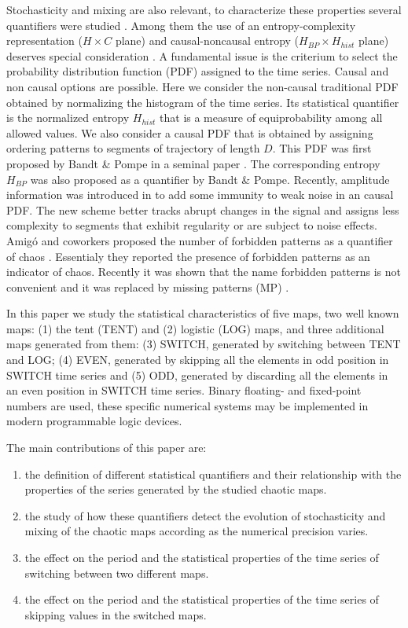 Stochasticity and mixing are also relevant, to characterize these properties several quantifiers were studied \cite{DeMicco2009}.
Among them the use of an entropy-complexity representation ($H \times C$ plane) and causal-noncausal entropy ($H_{BP} \times H_{hist}$ plane) deserves special consideration \cite{Rosso2007,DeMicco2008,DeMicco2012,DeMicco2009,Rosso2010,Antonelli2017}.
A fundamental issue is the criterium to select the probability distribution function (PDF) assigned to the time series.
Causal and non causal options are possible.
Here we consider the non-causal traditional PDF obtained by normalizing the histogram of the time series.
Its statistical quantifier is the normalized entropy $H_{hist}$ that is a measure of equiprobability among all allowed values.
We also consider a causal PDF that is obtained by assigning ordering patterns to segments of trajectory of length $D$.
This PDF was first proposed by Bandt \& Pompe in a seminal paper \cite{Bandt2002}.
The corresponding entropy $H_{BP}$ was also proposed as a quantifier by Bandt \& Pompe.
Recently, amplitude information was introduced in \cite{Fadlallah2013} to add some immunity to weak noise in an causal PDF.
The new scheme better tracks abrupt changes in the signal and assigns less complexity to segments that exhibit regularity or are subject to noise effects.
Amig\'o and coworkers proposed the number of forbidden patterns as a quantifier of chaos \cite{Amigo2007a}.
Essentialy they reported the presence of forbidden patterns as an indicator of chaos.
Recently it was shown that the name forbidden patterns is not convenient and it was replaced by missing patterns (MP) \cite{Rosso2012}.

In this paper we study the statistical characteristics of five maps, two well known maps: (1) the tent (TENT) and (2) logistic (LOG) maps, and three additional maps generated from them: (3) SWITCH, generated by switching between TENT and LOG; (4) EVEN, generated by skipping all the elements in odd position in SWITCH time series and (5) ODD, generated by discarding all the elements in an even position in SWITCH time series.
Binary floating- and fixed-point numbers are used, these specific numerical systems may be implemented in modern programmable logic devices.

The main contributions of this paper are:
\begin{enumerate}
\item the definition of different statistical quantifiers and their relationship with the properties of the series generated by the studied chaotic maps.
\item the study of how these quantifiers detect the evolution of stochasticity and mixing of the chaotic maps according as the numerical precision varies.
\item the effect on the period and the statistical properties of the time series of switching between two different maps.
\item the effect on the period and the statistical properties of the time series of skipping values in the switched maps.
\end{enumerate}

